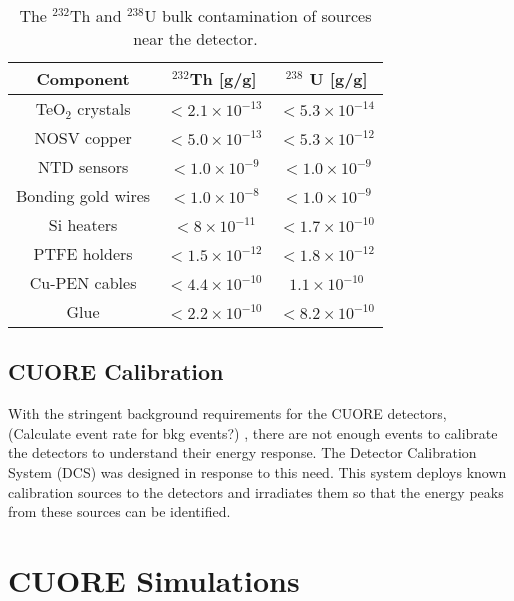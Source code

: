 \documentclass[12pt,a4paper]{article}
\begin{document}
\begin{table}[htbp]
\centering
\caption{The $^{232}$Th and $^{238}$U bulk contamination of sources near the detector.}
\label{tab:NearDetectorSources}
\begin{tabular}{|c|c|c|}
\hline 
 Component & $^{232}$Th [g/g] & $^{238}$ U [g/g] \\ 
\hline 
TeO$_2$ crystals & $< 2.1\times 10^{-13}$ & $<5.3\times 10^{-14}$ \\ 
\hline 
NOSV copper & $<5.0 \times 10^{-13}$ & $<5.3 \times 10^{-12}$ \\ 
\hline 
NTD sensors & $< 1.0 \times 10^{-9}$ & $<1.0 \times 10^{-9}$ \\ 
\hline 
Bonding gold wires & $< 1.0 \times 10^{-8}$ & $<1.0 \times 10^{-9}$ \\ 
\hline 
Si heaters &   $<8\times 10^{-11}$ & $<1.7 \times 10^{-10}$ \\ 
\hline 
PTFE holders & $<1.5\times 10^{-12}$ & $<1.8 \times 10^{-12}$ \\ 
\hline 
Cu-PEN cables & $<4.4\times 10^{-10}$ & $1.1 \times 10^{-10}$ \\ 
\hline
Glue & $<2.2\times 10^{-10}$ & $<8.2\times10^{-10}$ \\
\hline 
\end{tabular} 
\end{table}

\subsection{CUORE Calibration}

With the stringent background requirements for the CUORE detectors, (\color{red}Calculate event rate for bkg events?\color{black}) , there are not enough events to calibrate the detectors to understand their energy response. The Detector Calibration System (DCS) was designed in response to this need. This system deploys known calibration sources to the detectors and irradiates them so that the energy peaks from these sources can be identified. 


\section{CUORE Simulations}
\end{document}
